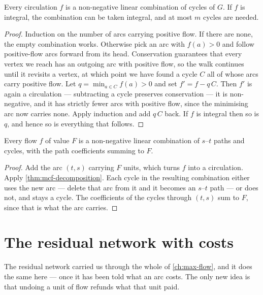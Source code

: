 \begin{theorem}\label{thm:mcf-decomposition}
Every circulation $f$ is a non-negative linear combination of cycles of $G$. If
$f$ is integral, the combination can be taken integral, and at most $m$ cycles
are needed.
\end{theorem}

\begin{proof}
Induction on the number of arcs carrying positive flow. If there are none, the
empty combination works. Otherwise pick an arc with $f(a) > 0$ and follow
positive-flow arcs forward from its head. Conservation guarantees that every
vertex we reach has an outgoing arc with positive flow, so the walk continues
until it revisits a vertex, at which point we have found a cycle $C$ all of
whose arcs carry positive flow. Let $q = \min_{a \in C} f(a) > 0$ and set
$f' = f - q\,C$. Then $f'$ is again a circulation --- subtracting a cycle
preserves conservation --- it is non-negative, and it has strictly fewer arcs
with positive flow, since the minimising arc now carries none. Apply induction
and add $q\,C$ back. If $f$ is integral then so is $q$, and hence so is
everything that follows.
\end{proof}

\begin{corollary}\label{cor:mcf-decomposition-flow}
Every flow $f$ of value $F$ is a non-negative linear combination of $s$--$t$
paths and cycles, with the path coefficients summing to $F$.
\end{corollary}

\begin{proof}
Add the arc $(t,s)$ carrying $F$ units, which turns $f$ into a circulation.
Apply \cref{thm:mcf-decomposition}. Each cycle in the resulting combination
either uses the new arc --- delete that arc from it and it becomes an $s$--$t$
path --- or does not, and stays a cycle. The coefficients of the cycles through
$(t,s)$ sum to $F$, since that is what the arc carries.
\end{proof}

\section{The residual network with costs}
\label{sec:mcf-residual}

The residual network carried us through the whole of \cref{ch:max-flow}, and
it does the same here --- once it has been told what an arc costs. The only
new idea is that undoing a unit of flow refunds what that unit paid.


